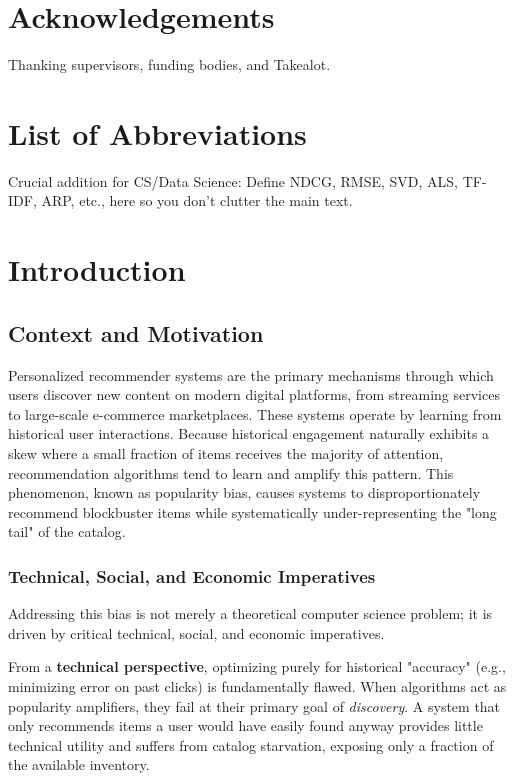 \documentclass[11pt,a4paper]{report}
\begin{document}
\chapter*{Acknowledgements}
Thanking supervisors, funding bodies, and Takealot.

\tableofcontents
\newpage
\listoffigures
\listoftables

\chapter*{List of Abbreviations}
Crucial addition for CS/Data Science: Define NDCG, RMSE, SVD, ALS, TF-IDF, ARP, etc., here so you don't clutter the main text.

\newpage

\chapter{Introduction}
\label{ch:introduction}

\section{Context and Motivation}
Personalized recommender systems are the primary mechanisms through which users discover new content on modern digital platforms, from streaming services to large-scale e-commerce marketplaces. These systems operate by learning from historical user interactions. Because historical engagement naturally exhibits a skew where a small fraction of items receives the majority of attention, recommendation algorithms tend to learn and amplify this pattern. This phenomenon, known as popularity bias, causes systems to disproportionately recommend blockbuster items while systematically under-representing the "long tail" of the catalog.

\subsection{Technical, Social, and Economic Imperatives}
Addressing this bias is not merely a theoretical computer science problem; it is driven by critical technical, social, and economic imperatives. 

From a \textbf{technical perspective}, optimizing purely for historical "accuracy" (e.g., minimizing error on past clicks) is fundamentally flawed. When algorithms act as popularity amplifiers, they fail at their primary goal of \textit{discovery}. A system that only recommends items a user would have easily found anyway provides little technical utility and suffers from catalog starvation, exposing only a fraction of the available inventory.
\end{document}
